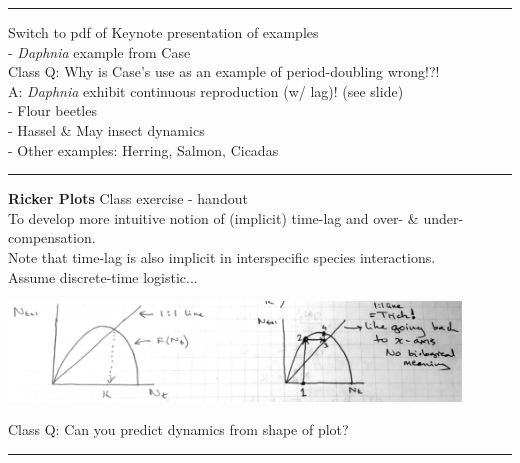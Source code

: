 \documentclass{article}
\newcommand{\note}[1]{\colorbox{gray!30}{#1}}
\newcommand{\ind}{\-\hspace{1cm}}
\begin{document}
\rule[0.5ex]{\linewidth}{1pt}

\note{Switch to pdf of Keynote presentation of examples}\\
\ind - \emph{Daphnia} example from Case\\
\ind \ind \note{Class Q:} Why is Case's use as an example of period-doubling wrong!?!\\
\ind \ind \note{A:} \emph{Daphnia} exhibit continuous reproduction (w/ lag)! (see slide)\\
\ind - Flour beetles\\
\ind - Hassel \& May insect dynamics\\
\ind - Other examples: Herring, Salmon, Cicadas\\

\rule[0.5ex]{\linewidth}{1pt}

\textbf{Ricker Plots} \note{Class exercise - handout}\\
To develop more intuitive notion of (implicit) time-lag and over- \& under-compensation.\\
Note that time-lag is also implicit in interspecific species interactions.\\
Assume discrete-time logistic...

\begin{center}
	\includegraphics[width=12cm]{figs/RickerCurve.pdf}
\end{center}

\note{Class Q:} Can you predict dynamics from shape of plot?\\

\rule[0.5ex]{\linewidth}{1pt}
\end{document}
